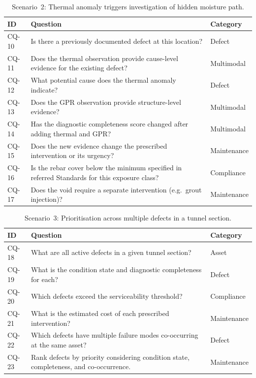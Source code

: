 \documentclass[11pt,a4paper]{article}
\begin{document}
\begin{table}[htbp]
\centering
\caption{Scenario~2: Thermal anomaly triggers investigation of hidden
  moisture path.}
\label{tab:cq-scenario2}
\begin{tabularx}{\linewidth}{@{}l X l@{}}
\toprule
\textbf{ID} & \textbf{Question} & \textbf{Category} \\
\midrule
CQ-10 & Is there a previously documented defect at this location? &
  Defect \\
CQ-11 & Does the thermal observation provide cause-level evidence for
  the existing defect? & Multimodal \\
CQ-12 & What potential cause does the thermal anomaly indicate? &
  Defect \\
CQ-13 & Does the GPR observation provide structure-level evidence? &
  Multimodal \\
CQ-14 & Has the diagnostic completeness score changed after adding
  thermal and GPR? & Multimodal \\
CQ-15 & Does the new evidence change the prescribed intervention or its
  urgency? & Maintenance \\
CQ-16 & Is the rebar cover below the minimum specified in referred Standards for
  this exposure class? & Compliance \\
CQ-17 & Does the void require a separate intervention (e.g.\ grout
  injection)? & Maintenance \\
\bottomrule
\end{tabularx}
\end{table}


\begin{table}[htbp]
\centering
\caption{Scenario~3: Prioritisation across multiple defects in a
  tunnel section.}
\label{tab:cq-scenario3}
\begin{tabularx}{\linewidth}{@{}l X l@{}}
\toprule
\textbf{ID} & \textbf{Question} & \textbf{Category} \\
\midrule
CQ-18 & What are all active defects in a given tunnel section? &
  Asset \\
CQ-19 & What is the condition state and diagnostic completeness for
  each? & Defect \\
CQ-20 & Which defects exceed the serviceability threshold? &
  Compliance \\
CQ-21 & What is the estimated cost of each prescribed intervention? &
  Maintenance \\
CQ-22 & Which defects have multiple failure modes co-occurring at the
  same asset? & Defect \\
CQ-23 & Rank defects by priority considering condition state,
  completeness, and co-occurrence. & Maintenance \\
\bottomrule
\end{tabularx}
\end{table}
\end{document}
